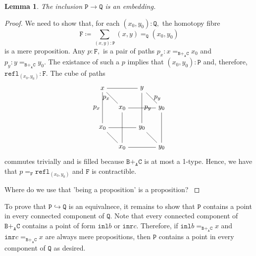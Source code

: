 \documentclass[12pt]{amsart}
\newcommand{\bydef}{\coloneqq}
\newcommand{\edit}[1]{{\color{red} #1 }}
\newcommand{\type}[1]{\mathtt{#1}}
\newcommand{\tin}{\colon}
\newcommand{\A}{\type{A}}
\newcommand{\B}{\type{B}}
\newcommand{\C}{\type{C}}
\renewcommand{\P}{\type{P}}
\newcommand{\Q}{\type{Q}}
\newcommand{\BAC}{\B +_{\A} \C}
\newcommand{\inl}{\type{inl}}
\newcommand{\inr}{\type{inr}}
\newcommand{\refl}{\type{refl}}
\newtheorem{lemma}{Lemma}
\theoremstyle{remark}
\theoremstyle{definition}
\begin{document}
\begin{lemma} \label{thm:inclusion-is-embedding}
%
  The inclusion
  \(
    \P \to \Q
  \)
  is an embedding.
%
\end{lemma}
\begin{proof}
%
  We need to show that, for each
  \(
     ( x_0 , y_0 ) \tin \Q,
  \)
  the homotopy fibre
  \[
     \type{F} \bydef
     \sum\limits_{ ( x,y ) \tin \P}
     ( x,y ) =_{\Q} ( x_0,y_0 )
  \]
  is a mere proposition. Any
  \(
    p \tin \type{F},
  \)
  is a pair of paths
  \(
    p_x \tin x =_{\BAC} x_0
  \)
  and
  \(
    p_y \tin y =_{\BAC} y_0.
  \)
  The existance of such a $p$ implies that 
  \(
    ( x_0,y_0 ) \tin \P
  \)
  and, therefore,
  \(
    \refl_{ ( x_0,y_0 ) } \tin \type{F}.
  \)
  The cube of paths
    \[
      \begin{tikzpicture}
        \node (1) at (0,2) {\( x \)};
        \node (2) at (2,2) {\( y \)};
        \node (3) at (1,1) {\( x_0 \)};
        \node (4) at (3,1) {\( y_0 \)};
        \node (5) at (0,0) {\( x_0 \)};
        \node (6) at (2,0) {\( y_0 \)};
        \node (7) at (1,-1) {\( x_0 \)};
        \node (8) at (3,-1) {\( y_0 \)};
        \draw [-] (1) to (2);
        \draw [-] (3) to (4);
        \draw [-] (5) to (6);
        \draw [-] (7) to (8);
        \draw [-] (1) to node [left] {\( p_x \)} (3);
        \draw [-] (2) to node [right] {\( p_y \)} (4);
        \draw [-] (5) to (7);
        \draw [-] (6) to (8);
        \draw [-] (1) to node [left] {\( p_x \)} (5);
        \draw [-] (2) to node [right] {\( p_y \)} (6);
        \draw [-] (3) to (7);
        \draw [-] (4) to (8); 
      \end{tikzpicture}
    \]
    commutes trivially and is filled because \( \BAC \) is at most a
    1-type. Hence, we have that
    \(
       p =_{ \type{F} } \refl_{ ( x_0,y_0 ) }
    \)
    and \( \type{F} \) is contractible.
    \par

    \edit{Where do we use that 'being a proposition' is a
      proposition?}
%
\end{proof}


To prove that
%
\( 
   \P \hookrightarrow \Q
\)
%
is an equivalnece, it remains to show that \( \P \) contains a point
in every connected component of \( \Q \). Note that every connected
component of \( \BAC \) contains a point of form \( \inl b \) or
\( \inr c \). Therefore, if
%
\(
   \inl b =_{\BAC} x
\)
%
and
%
\(
   \inr c =_{\BAC} x
\)
%
are always mere propositions, then \( \P \) contains a point in every
component of \( \Q \) as desired.
\par
\end{document}
